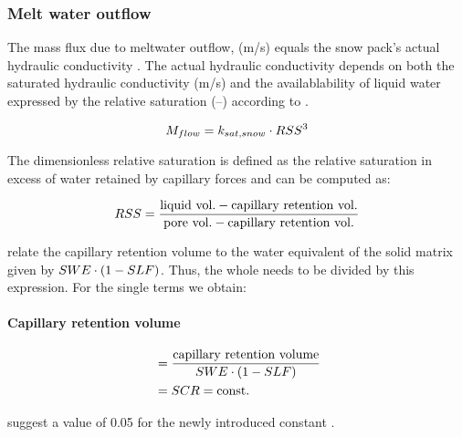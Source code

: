 
\subsubsection{Melt water outflow}
The mass flux due to meltwater outflow, \massfluxFlow{} (m/s) equals the snow pack's actual hydraulic conductivity \citep[][cited in \citet{Tarboton1996}]{Male1981}. The actual hydraulic conductivity depends on both the saturated hydraulic conductivity \snowSatHydrCond{} (m/s) and the availablability of liquid water expressed by the relative saturation \snowRelSaturation{} (--) according to  \citep[see][]{Illangasekare1990}.

\begin{equation} \label{eqn:snow-enBal_massfluxFlow}
  M_{flow} = k_{sat,snow} \cdot RSS^3
\end{equation}

The dimensionless relative saturation \snowRelSaturation{} is defined as the relative saturation in excess of water retained by capillary forces \citep{Illangasekare1990,Tarboton1996} and can be computed as:

\begin{equation} \label{eqn:snow-enBal_relSat-text}
  RSS{} = \frac{\text{liquid vol.}-\text{capillary retention vol.}}{\text{pore vol.}-\text{capillary retention vol.}}
\end{equation}

\citet{Tarboton1996} relate the capillary retention volume to the water equivalent of the solid matrix given by $SWE \cdot (1-SLF)$. Thus, the whole  needs to be divided by this expression. For the single terms we obtain:

\paragraph{Capillary retention volume}
\begin{align*}
  & = \frac{\text{capillary retention volume}}{SWE \cdot (1-SLF)} \\
  & = SCR = \text{const.}
\end{align*}

\citet{Tarboton1996} suggest a value of 0.05 for the newly introduced constant \snowRelCapRetent.


